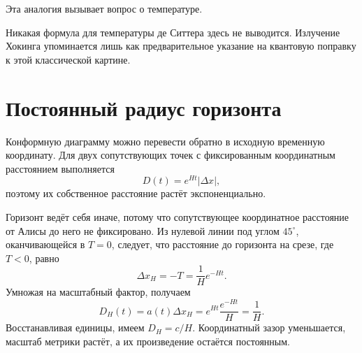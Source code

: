 Эта аналогия вызывает вопрос о температуре.

\begin{classroomqa}
\end{classroomqa}

Никакая формула для температуры де Ситтера здесь не выводится. Излучение Хокинга упоминается лишь как предварительное указание на квантовую поправку к этой классической картине.

\section{Постоянный радиус горизонта}

Конформную диаграмму можно перевести обратно в исходную временную координату. Для двух сопутствующих точек с фиксированным координатным расстоянием выполняется
\begin{equation}
D(t)=e^{Ht}\lvert\Delta x\rvert,
\end{equation}
поэтому их собственное расстояние растёт экспоненциально.

\begin{classroomqa}
\end{classroomqa}

Горизонт ведёт себя иначе, потому что сопутствующее координатное расстояние от Алисы до него не фиксировано. Из нулевой линии под углом \(45^\circ\), оканчивающейся в \(T=0\), следует, что расстояние до горизонта на срезе, где \(T<0\), равно
\begin{equation}
\Delta x_H=-T=\frac{1}{H}e^{-Ht}.
\label{eq:l08-coordinate-horizon}
\end{equation}
Умножая на масштабный фактор, получаем
\begin{equation}
D_H(t)=a(t)\Delta x_H
=e^{Ht}\frac{e^{-Ht}}{H}
=\frac{1}{H}.
\label{eq:l08-fixed-horizon}
\end{equation}
Восстанавливая единицы, имеем \(D_H=c/H\). Координатный зазор уменьшается, масштаб метрики растёт, а их произведение остаётся постоянным.

